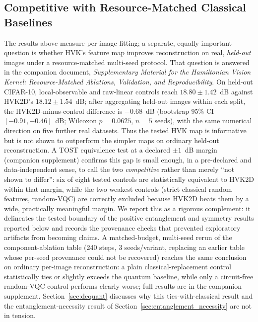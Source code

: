 \documentclass[11pt]{article}
\begin{document}
\subsection{Competitive with Resource-Matched Classical Baselines}
\label{sec:ablation_relationship}
The results above measure per-image fitting; a separate, equally important question is whether HVK's feature map improves reconstruction on real, \emph{held-out} images under a resource-matched multi-seed protocol. That question is answered in the companion document, \textit{Supplementary Material for the Hamiltonian Vision Kernel: Resource-Matched Ablations, Validation, and Reproducibility}. On held-out CIFAR-10, local-observable and raw-linear controls reach $18.80\pm1.42$~dB against HVK2D's $18.12\pm1.54$~dB; after aggregating held-out images within each split, the HVK2D-minus-control difference is $-0.68$~dB (bootstrap 95\% CI $[-0.91,-0.46]$~dB; Wilcoxon $p=0.0625$, $n=5$ seeds), with the same numerical direction on five further real datasets. Thus the tested HVK map is informative but is not shown to outperform the simpler maps on ordinary held-out reconstruction. A TOST equivalence test at a declared $\pm1$~dB margin (companion supplement) confirms this gap is small enough, in a pre-declared and data-independent sense, to call the two \emph{competitive} rather than merely ``not shown to differ'': six of eight tested controls are statistically equivalent to HVK2D within that margin, while the two weakest controls (strict classical random features, random-VQC) are correctly excluded because HVK2D beats them by a wide, practically meaningful margin. We report this as a rigorous complement: it delineates the tested boundary of the positive entanglement and symmetry results reported below and records the provenance checks that prevented exploratory artifacts from becoming claims. A matched-budget, multi-seed rerun of the component-ablation table (240 steps, 3 seeds/variant, replacing an earlier table whose per-seed provenance could not be recovered) reaches the same conclusion on ordinary per-image reconstruction: a plain classical-replacement control statistically ties or slightly exceeds the quantum baseline, while only a circuit-free random-VQC control performs clearly worse; full results are in the companion supplement. Section~\ref{sec:dequant} discusses why this ties-with-classical result and the entanglement-necessity result of Section~\ref{sec:entanglement_necessity} are not in tension.
\end{document}
